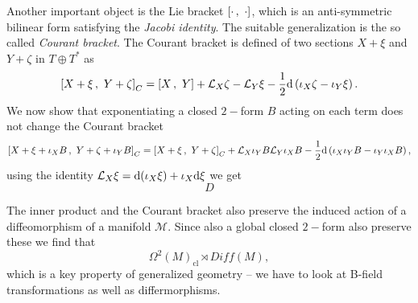 \documentclass{article}
\begin{document}
Another important object is the Lie bracket $\left[\cdot\,,\,\, \cdot\right]$, which is an anti-symmetric bilinear form satisfying the \textit{Jacobi identity}. The suitable generalization is the so called \textit{Courant bracket}. The Courant bracket is defined of two sections $X+\xi$ and $Y+\zeta$ in $T\oplus T^*$ as 
\begin{equation}
    \left[X+\xi\,,\,\, Y+\zeta\right]_C = \left[X\,,\,\, Y\right]+\mathcal{L}_X\zeta - \mathcal{L}_Y \xi-\frac{1}{2}\mathrm{d}\left(\iota_X\zeta-\iota_Y\xi\right).
\end{equation}
We now show that exponentiating a closed $2-$form $B$ acting on each term does not change the Courant bracket 
\begin{equation}
    \left[X+\xi+\iota_XB\,,\,\, Y+\zeta+\iota_YB\right]_C = \left[X+\xi\,,\,\, Y+\zeta\right]_C+\mathcal{L}_X\iota_YB\-\mathcal{L}_Y\iota_XB-\frac{1}{2}\mathrm{d} \left(\iota_X\iota_YB-\iota_Y\iota_XB\right),
\end{equation}
using the identity $\mathcal{L}_X\xi = \mathrm{d}(\iota_X\xi)+\iota_X\mathrm{d}\xi$ we get 
\begin{equation}
D
\end{equation}

The inner product and the Courant bracket also preserve the induced action of a diffeomorphism of a manifold $\mathcal{M}$. Since also a global closed $2-$form also preserve these we find that 
\begin{equation}
    \Omega^2(M)_{\text{cl}}\rtimes Diff(M),
\end{equation}
which is a key property of generalized geometry -- we have to look at B-field transformations as well as differmorphisms. 



\newpage


\end{document}
